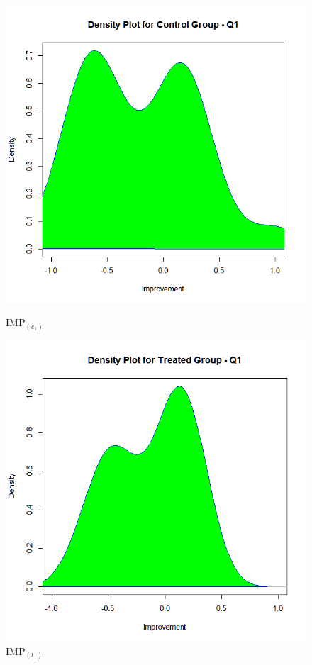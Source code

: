\begin{figure}
	\centering
	\begin{minipage}{.5\textwidth}
		\centering
		\includegraphics[width=1\linewidth]{figures/Imp_Control-q1}
		\caption{IMP$_{(c_1)}$}
		\label{fig:Imp_Control-q1}
	\end{minipage}%
	\begin{minipage}{.5\textwidth}
		\centering
		\includegraphics[width=1\linewidth]{figures/Imp_Treated-q1}
		\caption{IMP$_{(t_1)}$}
		\label{fig:Imp_Treated-q1}
	\end{minipage}
\end{figure}

